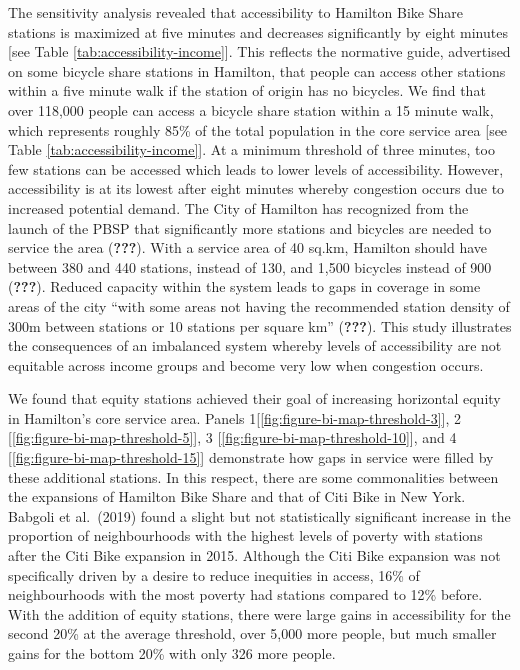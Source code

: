 \documentclass[]{elsarticle} %
\begin{document}
The sensitivity analysis revealed that accessibility to Hamilton Bike
Share stations is maximized at five minutes and decreases significantly
by eight minutes {[}see Table \ref{tab:accessibility-income}{]}. This
reflects the normative guide, advertised on some bicycle share stations
in Hamilton, that people can access other stations within a five minute
walk if the station of origin has no bicycles. We find that over 118,000
people can access a bicycle share station within a 15 minute walk, which
represents roughly 85\% of the total population in the core service area
{[}see Table \ref{tab:accessibility-income}{]}. At a minimum threshold
of three minutes, too few stations can be accessed which leads to lower
levels of accessibility. However, accessibility is at its lowest after
eight minutes whereby congestion occurs due to increased potential
demand. The City of Hamilton has recognized from the launch of the PBSP
that significantly more stations and bicycles are needed to service the
area ({\textbf{???}}). With a service area of 40 sq.km, Hamilton should
have between 380 and 440 stations, instead of 130, and 1,500 bicycles
instead of 900 ({\textbf{???}}). Reduced capacity within the system
leads to gaps in coverage in some areas of the city ``with some areas
not having the recommended station density of 300m between stations or
10 stations per square km'' ({\textbf{???}}). This study illustrates the
consequences of an imbalanced system whereby levels of accessibility are
not equitable across income groups and become very low when congestion
occurs.

We found that equity stations achieved their goal of increasing
horizontal equity in Hamilton's core service area. Panels
1{[}\ref{fig:figure-bi-map-threshold-3}{]}, 2
{[}\ref{fig:figure-bi-map-threshold-5}{]}, 3
{[}\ref{fig:figure-bi-map-threshold-10}{]}, and 4
{[}\ref{fig:figure-bi-map-threshold-15}{]} demonstrate how gaps in
service were filled by these additional stations. In this respect, there
are some commonalities between the expansions of Hamilton Bike Share and
that of Citi Bike in New York. Babgoli et al.~(2019) found a slight but
not statistically significant increase in the proportion of
neighbourhoods with the highest levels of poverty with stations after
the Citi Bike expansion in 2015. Although the Citi Bike expansion was
not specifically driven by a desire to reduce inequities in access, 16\%
of neighbourhoods with the most poverty had stations compared to 12\%
before. With the addition of equity stations, there were large gains in
accessibility for the second 20\% at the average threshold, over 5,000
more people, but much smaller gains for the bottom 20\% with only 326
more people.
\end{document}
